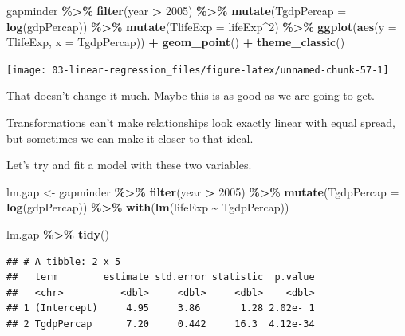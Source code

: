 \documentclass[
]{book}
\newenvironment{Shaded}{\begin{snugshade}}{\end{snugshade}}
\newcommand{\AttributeTok}[1]{\textcolor[rgb]{0.13,0.29,0.53}{#1}}
\newcommand{\DecValTok}[1]{\textcolor[rgb]{0.00,0.00,0.81}{#1}}
\newcommand{\FunctionTok}[1]{\textcolor[rgb]{0.13,0.29,0.53}{\textbf{#1}}}
\newcommand{\NormalTok}[1]{#1}
\newcommand{\OtherTok}[1]{\textcolor[rgb]{0.56,0.35,0.01}{#1}}
\newcommand{\SpecialCharTok}[1]{\textcolor[rgb]{0.81,0.36,0.00}{\textbf{#1}}}
\begin{document}
\begin{Shaded}
\begin{Highlighting}[]
\NormalTok{gapminder }\SpecialCharTok{\%\textgreater{}\%} 
  \FunctionTok{filter}\NormalTok{(year }\SpecialCharTok{\textgreater{}} \DecValTok{2005}\NormalTok{) }\SpecialCharTok{\%\textgreater{}\%}
  \FunctionTok{mutate}\NormalTok{(}\AttributeTok{TgdpPercap =} \FunctionTok{log}\NormalTok{(gdpPercap)) }\SpecialCharTok{\%\textgreater{}\%} 
  \FunctionTok{mutate}\NormalTok{(}\AttributeTok{TlifeExp =}\NormalTok{ lifeExp}\SpecialCharTok{\^{}}\DecValTok{2}\NormalTok{) }\SpecialCharTok{\%\textgreater{}\%} 
  \FunctionTok{ggplot}\NormalTok{(}\FunctionTok{aes}\NormalTok{(}\AttributeTok{y =}\NormalTok{ TlifeExp, }\AttributeTok{x =}\NormalTok{  TgdpPercap)) }\SpecialCharTok{+} 
  \FunctionTok{geom\_point}\NormalTok{() }\SpecialCharTok{+}
  \FunctionTok{theme\_classic}\NormalTok{()}
\end{Highlighting}
\end{Shaded}

\begin{center}\texttt{[image: 03-linear-regression\_files/figure-latex/unnamed-chunk-57-1]} \end{center}

That doesn't change it much. Maybe this is as good as we are going to get.

Transformations can't make relationships look exactly linear with equal spread, but sometimes we can make it closer to that ideal.

Let's try and fit a model with these two variables.

\begin{Shaded}
\begin{Highlighting}[]
\NormalTok{lm.gap }\OtherTok{\textless{}{-}}\NormalTok{ gapminder }\SpecialCharTok{\%\textgreater{}\%} 
  \FunctionTok{filter}\NormalTok{(year }\SpecialCharTok{\textgreater{}} \DecValTok{2005}\NormalTok{) }\SpecialCharTok{\%\textgreater{}\%}
  \FunctionTok{mutate}\NormalTok{(}\AttributeTok{TgdpPercap =} \FunctionTok{log}\NormalTok{(gdpPercap)) }\SpecialCharTok{\%\textgreater{}\%} 
  \FunctionTok{with}\NormalTok{(}\FunctionTok{lm}\NormalTok{(lifeExp }\SpecialCharTok{\textasciitilde{}}\NormalTok{ TgdpPercap))}

\NormalTok{lm.gap }\SpecialCharTok{\%\textgreater{}\%} 
  \FunctionTok{tidy}\NormalTok{()}
\end{Highlighting}
\end{Shaded}

\begin{verbatim}
## # A tibble: 2 x 5
##   term        estimate std.error statistic  p.value
##   <chr>          <dbl>     <dbl>     <dbl>    <dbl>
## 1 (Intercept)     4.95     3.86       1.28 2.02e- 1
## 2 TgdpPercap      7.20     0.442     16.3  4.12e-34
\end{verbatim}
\end{document}
